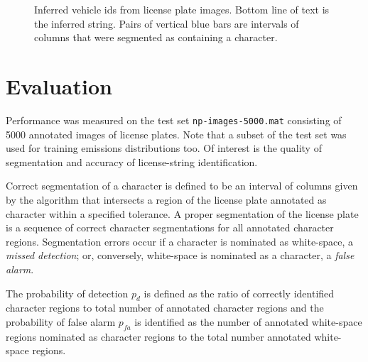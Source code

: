 \documentclass[a4paper,12pt]{article}
\begin{document}
\begin{figure}[h]
  \centering
  \caption{Inferred vehicle ids from license plate images. Bottom
    line of text is the inferred string. Pairs of vertical blue bars
    are intervals of columns that were segmented as containing a
    character.}
  \label{fig:inferred-strings}
\end{figure}

\section{Evaluation}
Performance was measured on the test set \texttt{np-images-5000.mat}
consisting of 5000 annotated images of license plates.  Note that a
subset of the test set was used for training emissions distributions
too. Of interest is the quality of segmentation and accuracy of
license-string identification.  

Correct segmentation of a character is defined to be an interval of
columns given by the algorithm that intersects a region of the license
plate annotated as character within a specified tolerance. A proper
segmentation of the license plate is a sequence of correct character
segmentations for all annotated character regions.  Segmentation
errors occur if a character is nominated as white-space, a
\emph{missed detection}; or, conversely, white-space is nominated as a
character, a \emph{false alarm}.

The probability of detection $p_d$ is defined as the ratio of correctly
identified character regions to total number of annotated character regions
and the probability of false alarm $p_{fa}$ is identified as the number
of annotated white-space regions nominated as character regions to the
total number annotated white-space regions.
\end{document}
